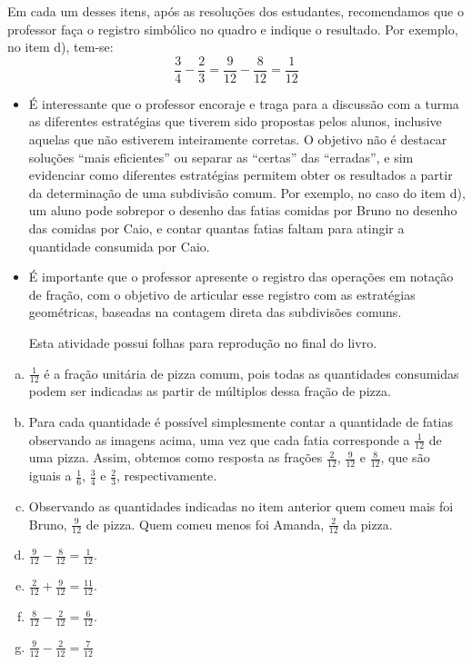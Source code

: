\begin{multicols}{2}
Em cada um desses itens, após as resoluções dos estudantes, recomendamos que o professor faça o registro simbólico no quadro e indique o resultado. Por exemplo, no item d), tem-se:
$$\frac{3}{4} - \frac{2}{3} = \frac{9}{12} - \frac{8}{12}=\frac{1}{12}$$
\begin{itemize}
  \item   É interessante que o professor encoraje e traga para a discussão com a turma as diferentes estratégias que tiverem sido propostas pelos alunos, inclusive aquelas que não estiverem inteiramente corretas. O objetivo não é destacar soluções ``mais eficientes'' ou separar as ``certas'' das ``erradas'', e sim evidenciar como diferentes estratégias permitem obter os resultados a partir da determinação de uma subdivisão comum. Por exemplo, no caso do item d), um aluno pode sobrepor o desenho das fatias comidas por Bruno no desenho das comidas por Caio, e contar quantas fatias faltam para atingir a quantidade consumida por Caio.
  \item  É importante que o professor apresente o registro das operações em notação de fração, com o objetivo de articular esse registro com as estratégias geométricas, baseadas na contagem direta das subdivisões comuns.

Esta atividade possui folhas para reprodução no final do livro.
\end{itemize} %


\begin{solucao}{}{}
  \begin{enumerate}[a)]
   \item $\frac{1}{12}$ é a fração unitária de pizza comum, pois todas as quantidades consumidas podem ser indicadas as partir de múltiplos dessa fração de pizza.
   \item Para cada quantidade é possível simplesmente contar a quantidade de fatias observando as imagens acima, uma vez que cada fatia corresponde a $\frac{1}{12}$ de uma pizza. Assim, obtemos como resposta as frações $\frac{2}{12}$, $\frac{9}{12}$ e $\frac{8}{12}$, que são iguais a $\frac{1}{6}$, $\frac{3}{4}$ e $\frac{2}{3}$, respectivamente.
   \item  Observando as quantidades indicadas no item anterior quem comeu mais foi Bruno, $\frac{9}{12}$ de pizza. Quem comeu menos foi Amanda, $\frac{2}{12}$ da pizza.
   \item  $\frac{9}{12} -  \frac{8}{12} = \frac{1}{12}$.   
   \item  $\frac{2}{12} +  \frac{9}{12} = \frac{11}{12}$.
   \item  $\frac{8}{12} -  \frac{2}{12} = \frac{6}{12}$.
   \item  $\frac{9}{12} -  \frac{2}{12} = \frac{7}{12}$
  \end{enumerate}


\end{solucao}
\end{multicols}
